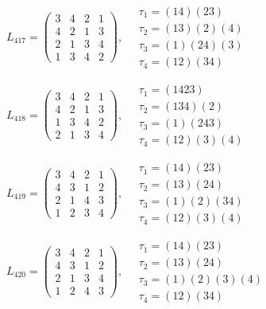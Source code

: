 $L_{417} = \begin{pmatrix} 3 & 4 & 2 & 1 \\ 4 & 2 & 1 & 3 \\ 2 & 1 & 3 & 4 \\ 1 & 3 & 4 & 2 \end{pmatrix}, \quad \begin{matrix} \tau_{1} = (1 4)(2 3) \\ \tau_{2} = (1 3)(2)(4) \\ \tau_{3} = (1)(2 4)(3) \\ \tau_{4} = (1 2)(3 4) \end{matrix}$

$L_{418} = \begin{pmatrix} 3 & 4 & 2 & 1 \\ 4 & 2 & 1 & 3 \\ 1 & 3 & 4 & 2 \\ 2 & 1 & 3 & 4 \end{pmatrix}, \quad \begin{matrix} \tau_{1} = (1 4 2 3) \\ \tau_{2} = (1 3 4)(2) \\ \tau_{3} = (1)(2 4 3) \\ \tau_{4} = (1 2)(3)(4) \end{matrix}$

$L_{419} = \begin{pmatrix} 3 & 4 & 2 & 1 \\ 4 & 3 & 1 & 2 \\ 2 & 1 & 4 & 3 \\ 1 & 2 & 3 & 4 \end{pmatrix}, \quad \begin{matrix} \tau_{1} = (1 4)(2 3) \\ \tau_{2} = (1 3)(2 4) \\ \tau_{3} = (1)(2)(3 4) \\ \tau_{4} = (1 2)(3)(4) \end{matrix}$

$L_{420} = \begin{pmatrix} 3 & 4 & 2 & 1 \\ 4 & 3 & 1 & 2 \\ 2 & 1 & 3 & 4 \\ 1 & 2 & 4 & 3 \end{pmatrix}, \quad \begin{matrix} \tau_{1} = (1 4)(2 3) \\ \tau_{2} = (1 3)(2 4) \\ \tau_{3} = (1)(2)(3)(4) \\ \tau_{4} = (1 2)(3 4) \end{matrix}$

